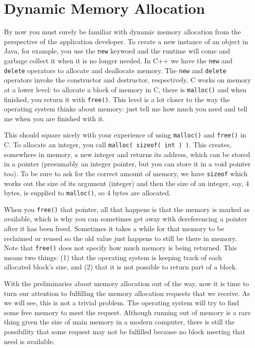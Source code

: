 




\section*{Dynamic Memory Allocation}
By now you must surely be familiar with dynamic memory allocation from the perspective of the application developer. To create a new instance of an object in Java, for example, you use the \texttt{new} keyword and the runtime will come and garbage collect it when it is no longer needed. In C++ we have the \texttt{new} and \texttt{delete} operators to allocate and deallocate memory. The \texttt{new} and \texttt{delete} operators invoke the constructor and destructor, respectively. C works on memory at a lower level: to allocate a block of memory in C, there is \texttt{malloc()} and when finished, you return it with \texttt{free()}. This level is a lot closer to the way the operating system thinks about memory: just tell me how much you need and tell me when you are finished with it.

This should square nicely with your experience of using \texttt{malloc()} and \texttt{free()} in C. To allocate an integer, you call \texttt{malloc( sizeof( int ) )}. This creates, somewhere in memory, a new integer and returns its address, which can be stored in a pointer (presumably an integer pointer, but you can store it in a void pointer too). To be sure to ask for the correct amount of memory, we have \texttt{sizeof} which works out the size of its argument (integer) and then the size of an integer, say, 4 bytes, is supplied to \texttt{malloc()}, so 4 bytes are allocated. 

When you \texttt{free()} that pointer, all that happens is that the memory is marked as available, which is why you can sometimes get away with dereferencing a pointer after it has been freed. Sometimes it takes a while for that memory to be reclaimed or reused so the old value just happens to still be there in memory. Note that \texttt{free()} does not specify how much memory is being returned. This means two things: (1) that the operating system is keeping track of each allocated block's size, and (2) that it is not possible to return part of a block.

With the preliminaries about memory allocation out of the way, now it is time to turn our attention to fulfilling the memory allocation requests that we receive. As we will see, this is not a trivial problem. The operating system will try to find some free memory to meet the request. Although running out of memory is a rare thing given the size of main memory in a modern computer, there is still the possibility that some request may not be fulfilled because no block meeting that need is available.

